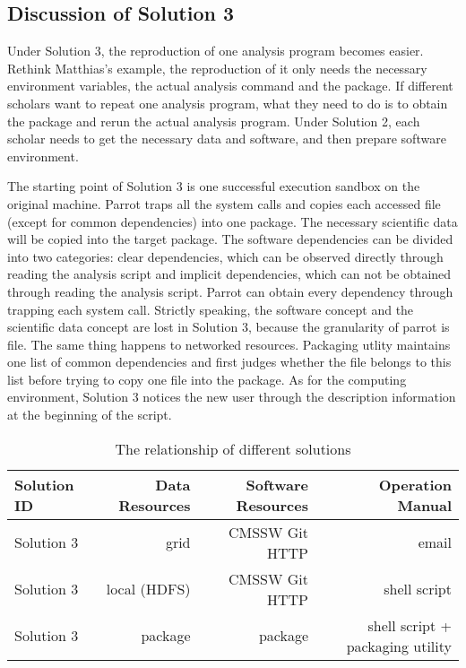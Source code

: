 \documentclass{acm_proc_article-sp}
\begin{document}
\subsection{Discussion of Solution 3} 

Under Solution 3, the reproduction of one analysis program becomes easier.
Rethink Matthias's example, the reproduction of it only needs
the necessary environment variables, the actual analysis command
and the package. If different scholars want to repeat one analysis program,
what they need to do is to obtain the package and rerun the actual analysis
program. Under Solution 2, each scholar needs to get the necessary data and
software, and then prepare software environment. 

The starting point of Solution 3 is one successful execution sandbox on the original machine. 
Parrot traps all the system calls and copies each accessed file (except for common dependencies) into one package.
The necessary scientific data will be copied into the target package.
The software dependencies can be divided into two categories: clear dependencies, which can be observed directly through reading the analysis script and implicit dependencies,
which can not be obtained through reading the analysis script. 
Parrot can obtain every dependency through trapping each system call.
Strictly speaking, the software concept and the scientific data concept are lost in Solution 3, because
the granularity of parrot is file.
The same thing happens to networked resources.
Packaging utlity maintains one list of common dependencies and first judges whether the file belongs to this list before trying to copy one file into the package.
As for the computing environment, Solution 3 notices the new user through the description information at the beginning of the script.

\begin{table*}
    \centering
    \begin{tabular}{|l|r|r|r|}
        \hline
        Solution ID & Data Resources & Software Resources & Operation Manual \\ \hline
        Solution 3& grid & CMSSW Git HTTP & email \\ \hline
        Solution 3& local (HDFS) & CMSSW Git HTTP & shell script \\ \hline
        Solution 3& package & package & shell script + packaging utility \\ \hline
    \end{tabular}
    \caption{The relationship of different solutions}
    \label{table:relationship}
\end{table*}
\end{document}
